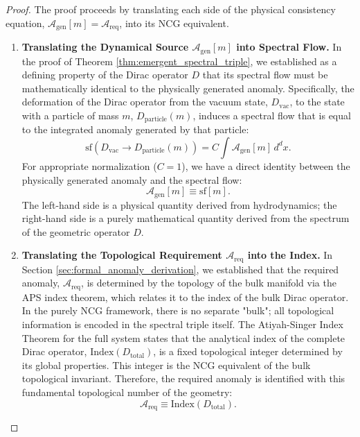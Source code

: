 \documentclass[11pt, letterpaper]{report}
\theoremstyle{plain} %
\theoremstyle{definition} %
\theoremstyle{remark} %
\newcommand{\Index}{\text{Index}}
\begin{document}
\begin{proof}
The proof proceeds by translating each side of the physical consistency equation, $\mathcal{A}_{\text{gen}}[m] = \mathcal{A}_{\text{req}}$, into its NCG equivalent.

\begin{enumerate}
    \item \textbf{Translating the Dynamical Source $\mathcal{A}_{\text{gen}}[m]$ into Spectral Flow.}
    In the proof of Theorem \ref{thm:emergent_spectral_triple}, we established as a defining property of the Dirac operator $D$ that its spectral flow must be mathematically identical to the physically generated anomaly. Specifically, the deformation of the Dirac operator from the vacuum state, $D_{\text{vac}}$, to the state with a particle of mass $m$, $D_{\text{particle}}(m)$, induces a spectral flow that is equal to the integrated anomaly generated by that particle:
    \begin{equation}
        \text{sf}(D_{\text{vac}} \to D_{\text{particle}}(m)) = C \int \mathcal{A}_{\text{gen}}[m] \, d^dx.
    \end{equation}
    For appropriate normalization ($C=1$), we have a direct identity between the physically generated anomaly and the spectral flow:
    \begin{equation}
        \mathcal{A}_{\text{gen}}[m] \equiv \text{sf}[m].
        \label{eq:anomaly_is_spectral_flow}
    \end{equation}
    The left-hand side is a physical quantity derived from hydrodynamics; the right-hand side is a purely mathematical quantity derived from the spectrum of the geometric operator $D$.

    \item \textbf{Translating the Topological Requirement $\mathcal{A}_{\text{req}}$ into the Index.}
    In Section \ref{sec:formal_anomaly_derivation}, we established that the required anomaly, $\mathcal{A}_{\text{req}}$, is determined by the topology of the bulk manifold via the APS index theorem, which relates it to the index of the bulk Dirac operator. In the purely NCG framework, there is no separate "bulk"; all topological information is encoded in the spectral triple itself. The Atiyah-Singer Index Theorem for the full system states that the analytical index of the complete Dirac operator, $\Index(D_{\text{total}})$, is a fixed topological integer determined by its global properties. This integer is the NCG equivalent of the bulk topological invariant. Therefore, the required anomaly is identified with this fundamental topological number of the geometry:
    \begin{equation}
        \mathcal{A}_{\text{req}} \equiv \Index(D_{\text{total}}).
        \label{eq:req_is_index}
    \end{equation}


\end{enumerate}
\end{proof}
\end{document}

